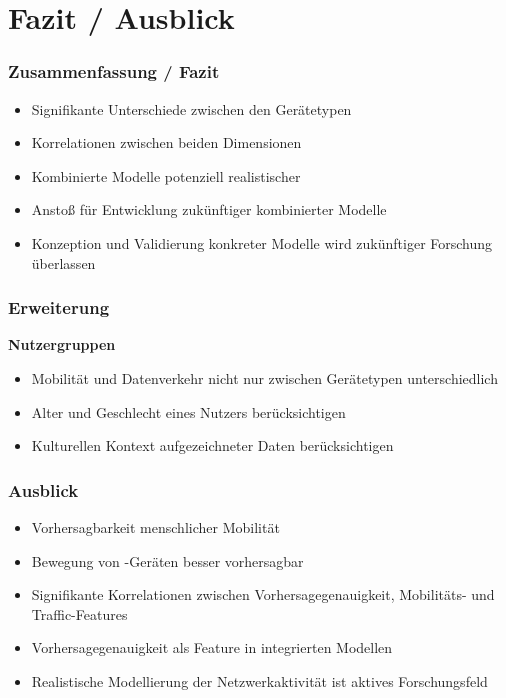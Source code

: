 \documentclass{beamer}
\begin{document}
\section{Fazit / Ausblick}

\begin{frame}
  \frametitle{Zusammenfassung / Fazit}
  \begin{itemize}
    \item Signifikante Unterschiede zwischen den Gerätetypen
    \item Korrelationen zwischen beiden Dimensionen
    \item Kombinierte Modelle potenziell realistischer
    \item Anstoß für Entwicklung zukünftiger kombinierter Modelle
    \item Konzeption und Validierung konkreter Modelle wird zukünftiger Forschung überlassen
  \end{itemize}  
\end{frame}

\begin{frame}
  \frametitle{Erweiterung}
  \textbf{Nutzergruppen}
  \begin{itemize}
    \item Mobilität und Datenverkehr nicht nur zwischen Gerätetypen unterschiedlich
    \item Alter und Geschlecht eines Nutzers berücksichtigen
    \item Kulturellen Kontext aufgezeichneter Daten berücksichtigen    
  \end{itemize}
\end{frame}

\begin{frame}
  \frametitle{Ausblick}
  \textit{ \cite{Alipour2019}}\newline
  \begin{itemize}
    \item Vorhersagbarkeit menschlicher Mobilität
    \item Bewegung von -Geräten besser vorhersagbar
    \item Signifikante Korrelationen zwischen Vorhersagegenauigkeit, Mobilitäts- und Traffic-Features
    \item Vorhersagegenauigkeit als Feature in integrierten Modellen
    \item Realistische Modellierung der Netzwerkaktivität ist aktives Forschungsfeld
  \end{itemize}  
\end{frame}

\begin{frame}[allowframebreaks]
  
  
\end{frame}
\end{document}
